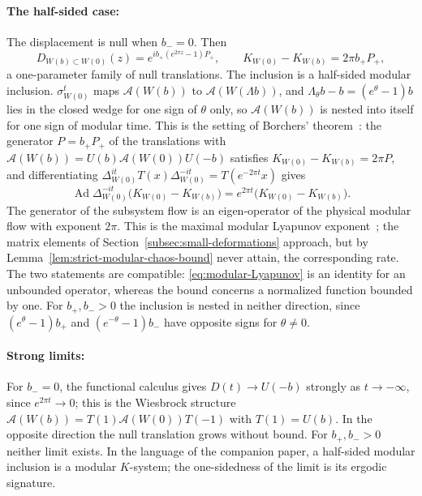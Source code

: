 \documentclass[a4paper,11pt]{article}
\theoremstyle{definition}
\begin{document}
\paragraph{The half-sided case:} The displacement is null when $b_-=0$. Then
\begin{equation}
 D_{W(b)\subset W(0)}(z)=e^{ib_+(e^{2\pi z}-1)P_+},\qquad
 K_{W(0)}-K_{W(b)}=2\pi b_+P_+ ,
 \label{eq:hsmi-wedge}
\end{equation}
a one-parameter family of null translations. The inclusion is a half-sided modular inclusion. $\sigma_{W(0)}^t$ maps $\mathcal A(W(b))$ to $\mathcal A(W(\Lambda b))$, and $\Lambda_\theta b-b=(e^\theta-1)b$ lies in the closed wedge for one sign of $\theta$ only, so $\mathcal A(W(b))$ is nested into itself for one sign of modular time. This is the setting of Borchers' theorem~\cite{revolutionizing,Wiesbrock1993}: the generator $P=b_+P_+$ of the translations with $\mathcal A(W(b))=U(b)\mathcal A(W(0))U(-b)$ satisfies $K_{W(0)}-K_{W(b)}=2\pi P$, and differentiating $\Delta_{W(0)}^{it}T(x)\Delta_{W(0)}^{-it}=T(e^{-2\pi t}x)$ gives
\begin{equation}
 \operatorname{Ad}\Delta_{W(0)}^{-it}\bigl(K_{W(0)}-K_{W(b)}\bigr)=e^{2\pi t}\bigl(K_{W(0)}-K_{W(b)}\bigr).
 \label{eq:modular-Lyapunov}
\end{equation}
The generator of the subsystem flow is an eigen-operator of the physical modular flow with exponent $2\pi$. This is the maximal modular Lyapunov exponent~\cite{deBoerLamprou2020,companion}; the matrix elements of Section~\ref{subsec:small-deformations} approach, but by Lemma~\ref{lem:strict-modular-chaos-bound} never attain, the corresponding rate. The two statements are compatible: \eqref{eq:modular-Lyapunov} is an identity for an unbounded operator, whereas the bound concerns a normalized function bounded by one. For $b_+,b_->0$ the inclusion is nested in neither direction, since $(e^\theta-1)b_+$ and $(e^{-\theta}-1)b_-$ have opposite signs for $\theta\ne0$.

\paragraph{Strong limits:} For $b_-=0$, the functional calculus gives $D(t)\to U(-b)$ strongly as $t\to-\infty$, since $e^{2\pi t}\to0$; this is the Wiesbrock structure $\mathcal A(W(b))=T(1)\mathcal A(W(0))T(-1)$ with $T(1)=U(b)$. In the opposite direction the null translation grows without bound. For $b_+,b_->0$ neither limit exists. In the language of the companion paper, a half-sided modular inclusion is a modular $K$-system; the one-sidedness of the limit is its ergodic signature.
\end{document}
